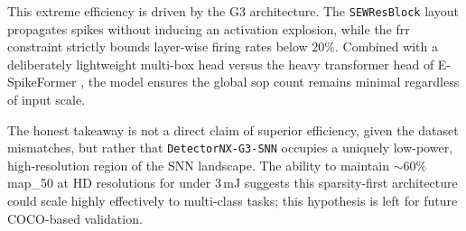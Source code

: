 This extreme efficiency is driven by the G3 architecture. 
The \texttt{SEWResBlock} layout propagates spikes without inducing an activation explosion, while the \gls{frr} constraint strictly bounds layer-wise firing rates below $20\%$. Combined with a deliberately lightweight multi-box head versus the heavy transformer head of E-SpikeFormer \cite{espikeformer}, the model ensures the global \gls{sop} count remains minimal regardless of input scale.

The honest takeaway is not a direct claim of superior efficiency, given the dataset mismatches, but rather that \texttt{DetectorNX-G3-SNN} occupies a uniquely low-power, high-resolution region of the SNN landscape. The ability to maintain $\sim 60\%$ \gls{map_50} at HD resolutions for under $3$\,mJ suggests this sparsity-first architecture could scale highly effectively to multi-class tasks; this hypothesis is left for future COCO-based validation.